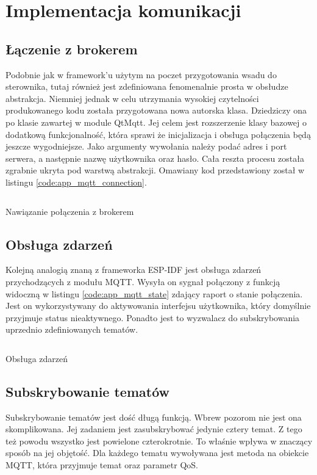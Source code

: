  \section{Implementacja komunikacji}
      \subsection{Łączenie z brokerem}
        Podobnie jak w framework'u użytym na poczet przygotowania wsadu do sterownika, tutaj również jest zdefiniowana fenomenalnie prosta w obsłudze abstrakcja. Niemniej jednak w celu utrzymania wysokiej czytelności produkowanego kodu została przygotowana nowa autorska klasa. Dziedziczy ona po klasie zawartej w module QtMqtt. Jej celem jest rozszerzenie klasy bazowej o dodatkową funkcjonalność, która sprawi że inicjalizacja i obsługa połączenia będą jeszcze wygodniejsze. Jako argumenty wywołania należy podać adres i port serwera, a następnie nazwę użytkownika oraz hasło. Cała reszta procesu została zgrabnie ukryta pod warstwą abstrakcji. Omawiany kod przedstawiony został w listingu \ref{code:app_mqtt_connection}.
        
        \begin{kod}
          \inputminted[firstline=21, lastline=34]{cpp}{app/listings/mqtt.cpp}
          \caption{Nawiązanie połączenia z brokerem}
          \label{code:app_mqtt_connection}
        \end{kod}
        
      \subsection{Obsługa zdarzeń}
        Kolejną analogią znaną z frameworka ESP-IDF jest obsługa zdarzeń przychodzących z modułu MQTT. Wysyła on sygnał połączony z funkcją widoczną w listingu \ref{code:app_mqtt_state} zdający raport o stanie połączenia. Jest on wykorzystywany do aktywowania interfejsu użytkownika, który domyślnie przyjmuje status nieaktywnego. Ponadto jest to wyzwalacz do subskrybowania uprzednio zdefiniowanych tematów.
        \begin{kod}
          \inputminted[firstline=102, lastline=127]{cpp}{app/listings/mainwindow.cpp}
          \caption{Obsługa zdarzeń}
          \label{code:app_mqtt_state}
        \end{kod}
        
        
      \subsection{Subskrybowanie tematów}
        Subskrybowanie tematów jest dość długą funkcją. Wbrew pozorom nie jest ona skomplikowana. Jej zadaniem jest zasubskrybować jedynie cztery temat. Z tego też powodu wszystko jest powielone czterokrotnie. To właśnie wpływa w znaczący sposób na jej objętość. Dla każdego tematu wywoływana jest metoda na obiekcie MQTT, która przyjmuje temat oraz parametr QoS. 
        
